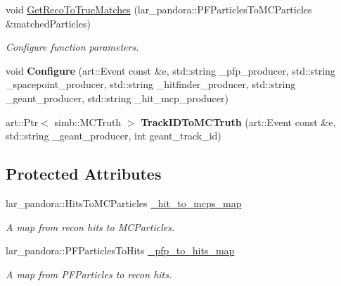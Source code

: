 \begin{DoxyCompactItemize}
\item 
void \hyperlink{classlee_1_1PandoraInterfaceHelper_a7c248af2e489ded3723275cd0a13a6ff}{Get\-Reco\-To\-True\-Matches} (lar\-\_\-pandora\-::\-P\-F\-Particles\-To\-M\-C\-Particles \&matched\-Particles)
\begin{DoxyCompactList}\small\item\em Configure function parameters. \end{DoxyCompactList}\item 
\hypertarget{classlee_1_1PandoraInterfaceHelper_a183d7e49018d16cb37d7fc299ad7ede1}{void {\bfseries Configure} (art\-::\-Event const \&e, std\-::string \-\_\-pfp\-\_\-producer, std\-::string \-\_\-spacepoint\-\_\-producer, std\-::string \-\_\-hitfinder\-\_\-producer, std\-::string \-\_\-geant\-\_\-producer, std\-::string \-\_\-hit\-\_\-mcp\-\_\-producer)}\label{classlee_1_1PandoraInterfaceHelper_a183d7e49018d16cb37d7fc299ad7ede1}

\item 
\hypertarget{classlee_1_1PandoraInterfaceHelper_a47c1f51234888908d4027cdc8e89972c}{art\-::\-Ptr$<$ simb\-::\-M\-C\-Truth $>$ {\bfseries Track\-I\-D\-To\-M\-C\-Truth} (art\-::\-Event const \&e, std\-::string \-\_\-geant\-\_\-producer, int geant\-\_\-track\-\_\-id)}\label{classlee_1_1PandoraInterfaceHelper_a47c1f51234888908d4027cdc8e89972c}

\end{DoxyCompactItemize}
\subsection*{Protected Attributes}
\begin{DoxyCompactItemize}
\item 
\hypertarget{classlee_1_1PandoraInterfaceHelper_add430a976fa40632e14eb1688cdd785b}{lar\-\_\-pandora\-::\-Hits\-To\-M\-C\-Particles \hyperlink{classlee_1_1PandoraInterfaceHelper_add430a976fa40632e14eb1688cdd785b}{\-\_\-hit\-\_\-to\-\_\-mcps\-\_\-map}}\label{classlee_1_1PandoraInterfaceHelper_add430a976fa40632e14eb1688cdd785b}

\begin{DoxyCompactList}\small\item\em A map from recon hits to M\-C\-Particles. \end{DoxyCompactList}\item 
\hypertarget{classlee_1_1PandoraInterfaceHelper_ae19df94cb2c29dc2735bf7436c5ccf63}{lar\-\_\-pandora\-::\-P\-F\-Particles\-To\-Hits \hyperlink{classlee_1_1PandoraInterfaceHelper_ae19df94cb2c29dc2735bf7436c5ccf63}{\-\_\-pfp\-\_\-to\-\_\-hits\-\_\-map}}\label{classlee_1_1PandoraInterfaceHelper_ae19df94cb2c29dc2735bf7436c5ccf63}

\begin{DoxyCompactList}\small\item\em A map from P\-F\-Particles to recon hits. \end{DoxyCompactList}\end{DoxyCompactItemize}


